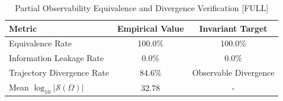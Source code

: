 \begin{table}[ht]
\centering
\caption{Partial Observability Equivalence and Divergence Verification [FULL]}
\begin{tabular}{lcc}
\hline
Metric & Empirical Value & Invariant Target \\
\hline
Equivalence Rate & 100.0\% & 100.0\% \\
Information Leakage Rate & 0.0\% & 0.0\% \\
Trajectory Divergence Rate & 84.6\% & Observable Divergence \\
Mean $\log_{10}|\mathcal{S}(\Omega)|$ & 32.78 & - \\
\hline
\end{tabular}
\end{table}
